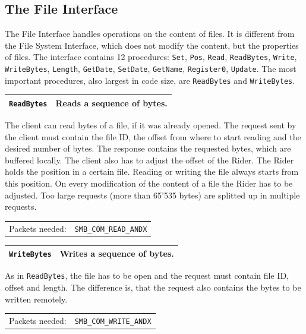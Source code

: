 \documentclass[11pt,a4paper]{book}
\begin{document}
\subsection{The File Interface}
The File Interface handles operations on the content of files. It is different from the File System Interface, which does not modify the content, but the properties of files. The interface contains 12 procedures: \texttt{Set}, \texttt{Pos}, \texttt{Read}, \texttt{ReadBytes}, \texttt{Write}, \texttt{WriteBytes}, \texttt{Length}, \texttt{GetDate}, \texttt{SetDate}, \texttt{GetName}, \texttt{Register0}, \texttt{Update}. The most important procedures, also largest in code size, are \texttt{ReadBytes} and \texttt{WriteBytes}.

\newpage 

\begin{center}
\renewcommand{\tabcolsep}{5mm}
\begin{tabular}{p{3cm}p{8cm}}
\texttt{ReadBytes} & \textbf{Reads a sequence of bytes.} \\ 
\hline
\end{tabular}
\end{center}
The client can read bytes of a file, if it was already opened. The request sent by the client must contain the file ID, the offset from where to start reading and the desired number of bytes. The response contains the requested bytes, which are buffered locally. The client also has to adjust the offset of the Rider. The Rider holds the position in a certain file. Reading or writing the file always starts from this position. On every modification of the content of a file the Rider has to be adjusted. Too large requests (more than 65'535 bytes) are splitted up in multiple requests. \\
\renewcommand{\tabcolsep}{5mm}
\begin{tabular}{p{3cm}p{8cm}}
Packets needed: & \texttt{SMB\_COM\_READ\_ANDX} \\
\end{tabular}

\begin{center}
\renewcommand{\tabcolsep}{5mm}
\begin{tabular}{p{3cm}p{8cm}}
\texttt{WriteBytes} & \textbf{Writes a sequence of bytes.} \\ 
\hline
\end{tabular}
\end{center}
As in \texttt{ReadBytes}, the file has to be open and the request must contain file ID, offset and length. The difference is, that the request also contains the bytes to be written remotely. \\
\renewcommand{\tabcolsep}{5mm}
\begin{tabular}{p{3cm}p{8cm}}
Packets needed: & \texttt{SMB\_COM\_WRITE\_ANDX} \\
\end{tabular} \\
\end{document}
